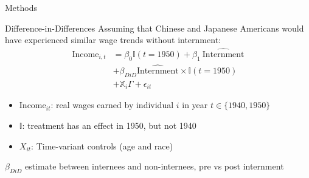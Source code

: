 \documentclass{beamer}
\begin{document}
\begin{frame}
  
\end{frame}

\begin{frame}{Methods}\label{methods}
  \begin{block}{Difference-in-Differences}
    Assuming that Chinese and Japanese Americans would have experienced similar wage trends without internment:
    \begin{align*}
    \text{Income}_{i,t} & = \beta_0 \mathbb{I}(t=1950) + \beta_1 ~ \widehat{\text{Internment}} \\
                        & + \beta_{DiD} \widehat{\text{Internment}} \times \mathbb{I}(t=1950) \\
                        & + \mathbb{X}_i \Gamma + \epsilon_{it}
    \end{align*}
  \end{block}
    \begin{itemize}
    \item Income$_{it}$: real wages earned by individual $i$ in year $t\in\{1940,1950\}$
    \item $\mathbb{I}$: treatment has an effect in 1950, but not 1940
    \item $X_{it}$: Time-variant controls (age and race)
    \end{itemize}
    $\beta_{DiD}$ estimate between internees and non-internees, pre vs post internment
\end{frame}
\end{document}
